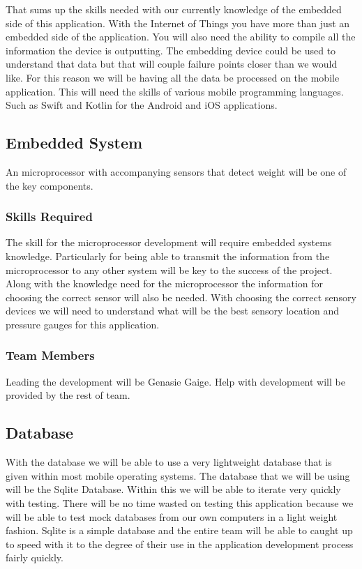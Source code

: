 \documentclass{article}
\begin{document}
That sums up the skills needed with our currently knowledge of the embedded side of this application. 
With the Internet of Things you have more than just an embedded side of the application. 
You will also need the ability to compile all the information the device is outputting. 
The embedding device could be used to understand that data but that will couple failure points closer than we would like.
For this reason we will be having all the data be processed on the mobile application.
This will need the skills of various mobile programming languages.
Such as Swift and Kotlin for the Android and iOS applications.

\subsection{Embedded System}
An microprocessor with accompanying sensors that detect weight will be one of the key components. 
\subsubsection{Skills Required}
The skill for the microprocessor development will require embedded systems knowledge.
Particularly for being able to transmit the information from the microprocessor to any other system will be key to the success of the project.
Along with the knowledge need for the microprocessor the information for choosing the correct sensor will also be needed.
With choosing the correct sensory devices we will need to understand what will be the best sensory location and pressure gauges for this application.
\subsubsection{Team Members}
Leading the development will be Genasie Gaige.
Help with development will be provided by the rest of team.


\subsection{Database}

With the database we will be able to use a very lightweight database that is given within most mobile operating systems. 
The database that we will be using will be the Sqlite Database. 
Within this we will be able to iterate very quickly with testing.
There will be no time wasted on testing this application because we will be able to test mock databases from our own computers in a light weight fashion.
Sqlite is a simple database and the entire team will be able to caught up to speed with it to the degree of their use in the application development process fairly quickly.
\end{document}
